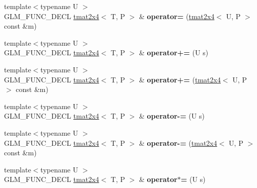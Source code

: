 \begin{DoxyCompactItemize}
\item 
\hypertarget{structglm_1_1tmat2x4_abec672d9eb6e8a3a6bdb0ffe46b1f3c7}{{\footnotesize template$<$typename U $>$ }\\G\-L\-M\-\_\-\-F\-U\-N\-C\-\_\-\-D\-E\-C\-L \hyperlink{structglm_1_1tmat2x4}{tmat2x4}$<$ T, P $>$ \& {\bfseries operator=} (\hyperlink{structglm_1_1tmat2x4}{tmat2x4}$<$ U, P $>$ const \&m)}\label{structglm_1_1tmat2x4_abec672d9eb6e8a3a6bdb0ffe46b1f3c7}

\item 
\hypertarget{structglm_1_1tmat2x4_a9df37229e9c50f1022701ffc52dcd1d2}{{\footnotesize template$<$typename U $>$ }\\G\-L\-M\-\_\-\-F\-U\-N\-C\-\_\-\-D\-E\-C\-L \hyperlink{structglm_1_1tmat2x4}{tmat2x4}$<$ T, P $>$ \& {\bfseries operator+=} (U s)}\label{structglm_1_1tmat2x4_a9df37229e9c50f1022701ffc52dcd1d2}

\item 
\hypertarget{structglm_1_1tmat2x4_a3fb9f1795e6f87a9822678ffcd1f6d9d}{{\footnotesize template$<$typename U $>$ }\\G\-L\-M\-\_\-\-F\-U\-N\-C\-\_\-\-D\-E\-C\-L \hyperlink{structglm_1_1tmat2x4}{tmat2x4}$<$ T, P $>$ \& {\bfseries operator+=} (\hyperlink{structglm_1_1tmat2x4}{tmat2x4}$<$ U, P $>$ const \&m)}\label{structglm_1_1tmat2x4_a3fb9f1795e6f87a9822678ffcd1f6d9d}

\item 
\hypertarget{structglm_1_1tmat2x4_a45b141f4b8af69b09a7acbdddc418247}{{\footnotesize template$<$typename U $>$ }\\G\-L\-M\-\_\-\-F\-U\-N\-C\-\_\-\-D\-E\-C\-L \hyperlink{structglm_1_1tmat2x4}{tmat2x4}$<$ T, P $>$ \& {\bfseries operator-\/=} (U s)}\label{structglm_1_1tmat2x4_a45b141f4b8af69b09a7acbdddc418247}

\item 
\hypertarget{structglm_1_1tmat2x4_ae58d059cf5f674054e6a82f3fde4dadd}{{\footnotesize template$<$typename U $>$ }\\G\-L\-M\-\_\-\-F\-U\-N\-C\-\_\-\-D\-E\-C\-L \hyperlink{structglm_1_1tmat2x4}{tmat2x4}$<$ T, P $>$ \& {\bfseries operator-\/=} (\hyperlink{structglm_1_1tmat2x4}{tmat2x4}$<$ U, P $>$ const \&m)}\label{structglm_1_1tmat2x4_ae58d059cf5f674054e6a82f3fde4dadd}

\item 
\hypertarget{structglm_1_1tmat2x4_a87bd7bad1ef757b47a7aa84b310a02be}{{\footnotesize template$<$typename U $>$ }\\G\-L\-M\-\_\-\-F\-U\-N\-C\-\_\-\-D\-E\-C\-L \hyperlink{structglm_1_1tmat2x4}{tmat2x4}$<$ T, P $>$ \& {\bfseries operator$\ast$=} (U s)}\label{structglm_1_1tmat2x4_a87bd7bad1ef757b47a7aa84b310a02be}


\end{DoxyCompactItemize}
